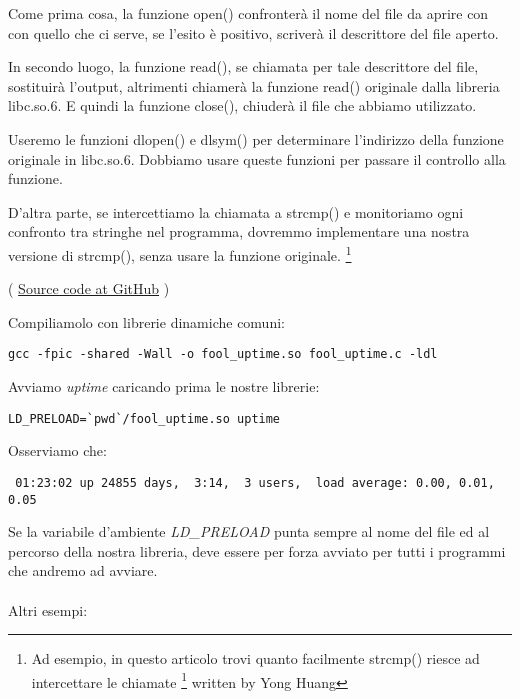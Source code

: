 Come prima cosa, la funzione open() confronterà il nome del file da aprire con con quello che ci serve,
se l'esito è positivo, scriverà il descrittore del file aperto.

In secondo luogo, la funzione read(), se chiamata per tale descrittore del file, sostituirà l'output, altrimenti chiamerà 
la funzione read() originale dalla libreria libc.so.6.
E quindi la funzione close(), chiuderà il file che abbiamo utilizzato.


Useremo le funzioni dlopen() e dlsym() per determinare l'indirizzo della funzione originale in libc.so.6.
Dobbiamo usare queste funzioni per passare il controllo alla  funzione.


D'altra parte, se intercettiamo la chiamata a strcmp() e monitoriamo ogni confronto tra stringhe
nel programma, dovremmo implementare una nostra versione di strcmp(), senza usare la funzione originale.
\footnote{Ad esempio, in questo articolo trovi quanto facilmente strcmp() riesce ad intercettare le chiamate
\footnote{\href{http://go.yurichev.com/17143}{yurichev.com}}
written by Yong Huang}


( \href{https://github.com/DennisYurichev/RE-for-beginners/blob/master/OS/LD_PRELOAD/fool_uptime.c}{Source code at GitHub} )

Compiliamolo con librerie dinamiche comuni:

\begin{lstlisting}
gcc -fpic -shared -Wall -o fool_uptime.so fool_uptime.c -ldl
\end{lstlisting}

Avviamo \emph{uptime} caricando prima le nostre librerie:

\begin{lstlisting}
LD_PRELOAD=`pwd`/fool_uptime.so uptime
\end{lstlisting}

Osserviamo che:

\begin{lstlisting}
 01:23:02 up 24855 days,  3:14,  3 users,  load average: 0.00, 0.01, 0.05
\end{lstlisting}

Se la variabile d'ambiente \emph{LD\_PRELOAD} punta sempre al nome del file ed al percorso della nostra libreria, 
deve essere per forza avviato per tutti i programmi che andremo ad avviare. \\
\\
Altri esempi:

